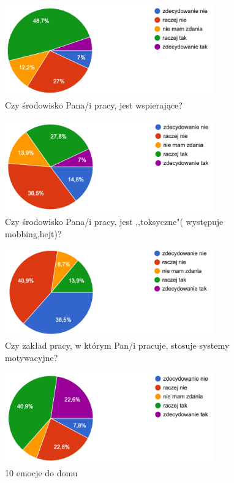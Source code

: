 \documentclass[a4paper,12pt,twoside,openany]{report}
\begin{document}
\begin{figure}
    \includegraphics[width=9cm]{wyniki/07_srod_wspiera}
    \caption{Czy środowisko Pana/i pracy, jest wspierające?}
    \label{rys:wspiera}
\end{figure}

\begin{figure}
    \includegraphics[width=9cm]{wyniki/08_srod_toksyczne}
    \caption{Czy środowisko Pana/i pracy, jest ,,toksyczne"( występuje mobbing,hejt)?}
    \label{rys:toksyczne}
\end{figure}

\begin{figure}
    \includegraphics[width=9cm]{wyniki/09_systemy_motyw}
    \caption{Czy zakład pracy, w którym Pan/i pracuje, stosuje systemy motywacyjne?}
    \label{rys:syst_motyw}
\end{figure}

\begin{figure}
    \includegraphics[width=9cm]{wyniki/10_emocje_do_domu}
    \caption{ 10 emocje do domu }
\end{figure}
\end{document}
